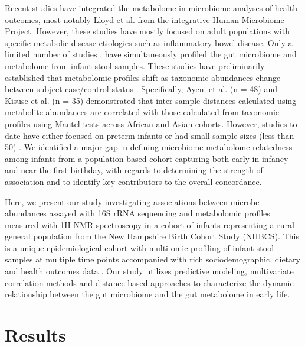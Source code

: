 Recent studies have integrated the metabolome in microbiome analyses of health outcomes, most notably Lloyd et al. \cite{lloyd-price2019multiomics} from the integrative Human Microbiome Project. However, these studies have mostly focused on adult populations with specific metabolic disease etiologies such as inflammatory bowel disease. Only a limited number of studies \cite{wandro2018microbiome, ayeni2018infant, stewart2017longitudinal, younge2019disrupted, brink2019early, kisuse2018urban}, have simultaneously profiled the gut microbiome and metabolome from infant stool samples. These studies have preliminarily established that metabolomic profiles shift as taxonomic abundances change between subject case/control status \cite{wandro2018microbiome, stewart2017longitudinal, younge2019disrupted, hill2017evolution}. Specifically, Ayeni et al. (n = 48) \cite{ayeni2018infant} and Kisuse et al. (n = 35) \cite{kisuse2018urban} demonstrated that inter-sample distances calculated using metabolite abundances are correlated with those calculated from taxonomic profiles using Mantel tests across African and Asian cohorts. However, studies to date have either focused on preterm infants \cite{wandro2018microbiome, stewart2017longitudinal, younge2019disrupted} or had small sample sizes (less than 50) \cite{ayeni2018infant, brink2019early, kisuse2018urban}. We identified a major gap in defining microbiome-metabolome relatedness among infants from a population-based cohort capturing both early in infancy and near the first birthday, with regards to determining the strength of association and to identify key contributors to the overall concordance. 

Here, we present our study investigating associations between microbe abundances assayed with 16S rRNA sequencing and metabolomic profiles measured with 1H NMR spectroscopy in a cohort of infants representing a rural general population from the New Hampshire Birth Cohort Study (NHBCS). This is a unique epidemiological cohort with multi-omic profiling of infant stool samples at multiple time points accompanied with rich sociodemographic, dietary and health outcomes data \cite{madan2016effects}. Our study utilizes predictive modeling, multivariate correlation methods and distance-based approaches to characterize the dynamic relationship between the gut microbiome and the gut metabolome in early life. 

\section{Results} 

